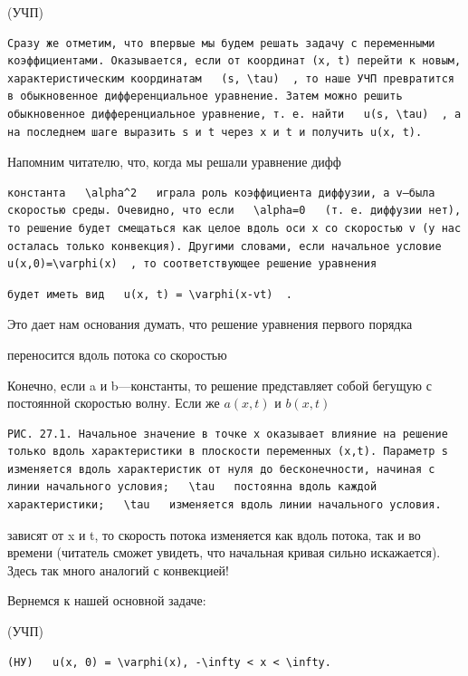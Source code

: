 \documentclass[
  ukrainian,
]{article}
\begin{document}
(УЧП)

\begin{verbatim}
Сразу же отметим, что впервые мы будем решать задачу с переменными коэффициентами. Оказывается, если от координат (x, t) перейти к новым, характеристическим координатам   (s, \tau)  , то наше УЧП превратится в обыкновенное дифференциальное уравнение. Затем можно решить обыкновенное дифференциальное уравнение, т. е. найти   u(s, \tau)  , а на последнем шаге выразить s и t через x и t и получить u(x, t).
\end{verbatim}

Напомним читателю, что, когда мы решали уравнение дифф

\begin{verbatim}
константа   \alpha^2   играла роль коэффициента диффузии, а v—была скоростью среды. Очевидно, что если   \alpha=0   (т. е. диффузии нет), то решение будет смещаться как целое вдоль оси x со скоростью v (у нас осталась только конвекция). Другими словами, если начальное условие   u(x,0)=\varphi(x)  , то соответствующее решение уравнения
\end{verbatim}

\begin{verbatim}
будет иметь вид   u(x, t) = \varphi(x-vt)  .
\end{verbatim}

Это дает нам основания думать, что решение уравнения первого порядка

переносится вдоль потока со скоростью

Конечно, если a и b---константы, то решение представляет собой бегущую с
постоянной скоростью волну. Если же \(a(x, t)\) и \(b(x, t)\)

\begin{verbatim}
РИС. 27.1. Начальное значение в точке x оказывает влияние на решение только вдоль характеристики в плоскости переменных (x,t). Параметр s изменяется вдоль характеристик от нуля до бесконечности, начиная с линии начального условия;   \tau   постоянна вдоль каждой характеристики;   \tau   изменяется вдоль линии начального условия.
\end{verbatim}

зависят от x и t, то скорость потока изменяется как вдоль потока, так и
во времени (читатель сможет увидеть, что начальная кривая сильно
искажается). Здесь так много аналогий с конвекцией!

Вернемся к нашей основной задаче:

(УЧП)

\begin{verbatim}
(НУ)   u(x, 0) = \varphi(x), -\infty < x < \infty.
\end{verbatim}
\end{document}
